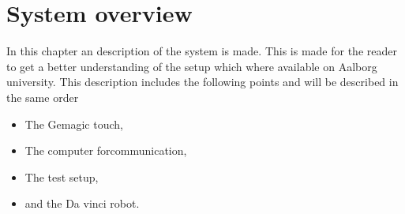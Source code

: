 \chapter{System overview}\label{cha:overview}

In this chapter an description of the system is made. This is made for the reader to get a better understanding of the setup which where available on Aalborg university. This description includes the following points and will be described in the same order

\begin{itemize}
  \item The Gemagic touch,
  \item The computer forcommunication,
  \item The test setup,
  \item and the Da vinci robot.
\end{itemize}










